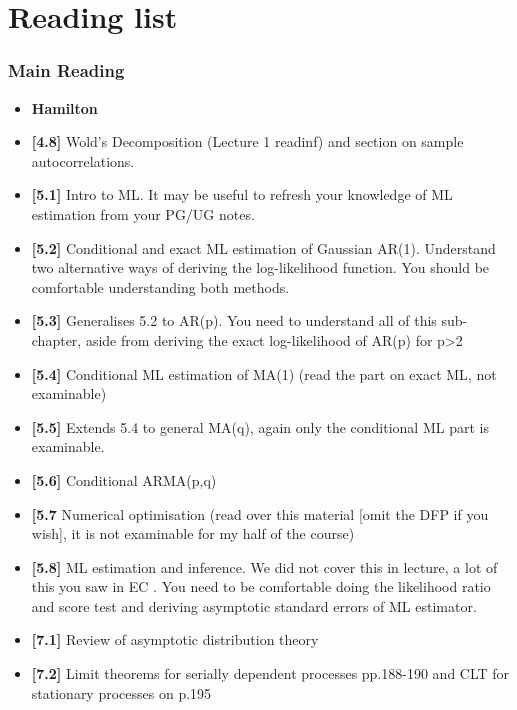 \documentclass{beamer}
\begin{document}
	\section{Reading list}
	\begin{frame}
		\frametitle{Main Reading}
		\begin{itemize}
			\footnotesize
			\item[] \textbf{Hamilton}
			\vspace{5pt}
			\item[] \textbf{[4.8]} Wold's Decomposition (Lecture 1 readinf) and section on sample autocorrelations.\vspace{10pt}
			\item[] \textbf{[5.1]} Intro to ML. It may be useful to refresh your knowledge of ML estimation from your PG/UG notes.
			\item[] \textbf{[5.2]} Conditional and exact ML estimation of Gaussian AR(1). Understand two alternative ways of deriving the log-likelihood function. You should be comfortable understanding both methods.
			\item[] \textbf{[5.3]} Generalises 5.2 to AR(p). You need to understand all of this sub-chapter, aside from deriving the exact log-likelihood of AR(p) for p>2
			\item[] \textbf{[5.4]} Conditional ML estimation of MA(1) (read the part on exact ML, not examinable)
			\item[] \textbf{[5.5]} Extends 5.4 to general MA(q), again only the conditional ML part is examinable.
			\item[] \textbf{[5.6]} Conditional ARMA(p,q)
			\item[] \textbf{[5.7} Numerical optimisation (read over this material [omit the DFP if you wish], it is not examinable for my half of the course)
			\item[] \textbf{[5.8]} ML estimation and inference. We did not cover this in lecture, a lot of this you saw in EC . You need to be comfortable doing the likelihood ratio and score test and deriving asymptotic standard errors of ML estimator.
			\vspace{10pt}
			\item[] \textbf{[7.1]} Review of asymptotic distribution theory
			\item[] \textbf{[7.2]} Limit theorems for serially dependent processes pp.188-190 and CLT for stationary processes on p.195
			
			\end{itemize}
	\end{frame}	
			
\end{document}
